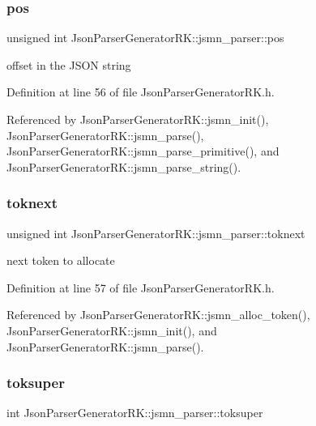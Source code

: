 \subsubsection{pos}
{\footnotesize\ttfamily unsigned int Json\+Parser\+Generator\+R\+K\+::jsmn\+\_\+parser\+::pos}



offset in the J\+S\+ON string 



Definition at line 56 of file Json\+Parser\+Generator\+R\+K.\+h.



Referenced by Json\+Parser\+Generator\+R\+K\+::jsmn\+\_\+init(), Json\+Parser\+Generator\+R\+K\+::jsmn\+\_\+parse(), Json\+Parser\+Generator\+R\+K\+::jsmn\+\_\+parse\+\_\+primitive(), and Json\+Parser\+Generator\+R\+K\+::jsmn\+\_\+parse\+\_\+string().

\mbox{\label{struct_json_parser_generator_r_k_1_1jsmn__parser_ac3b38630c87a1ede05cc8b84c78ff9e9}} 
\subsubsection{toknext}
{\footnotesize\ttfamily unsigned int Json\+Parser\+Generator\+R\+K\+::jsmn\+\_\+parser\+::toknext}



next token to allocate 



Definition at line 57 of file Json\+Parser\+Generator\+R\+K.\+h.



Referenced by Json\+Parser\+Generator\+R\+K\+::jsmn\+\_\+alloc\+\_\+token(), Json\+Parser\+Generator\+R\+K\+::jsmn\+\_\+init(), and Json\+Parser\+Generator\+R\+K\+::jsmn\+\_\+parse().

\mbox{\label{struct_json_parser_generator_r_k_1_1jsmn__parser_a5876016a03cc03cf6b9b24ad456a3d24}} 
\subsubsection{toksuper}
{\footnotesize\ttfamily int Json\+Parser\+Generator\+R\+K\+::jsmn\+\_\+parser\+::toksuper}




